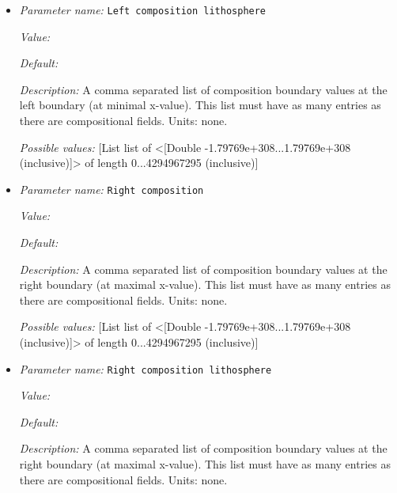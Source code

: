 \begin{itemize}
{\it Possible values:} [List list of <[Double -1.79769e+308...1.79769e+308 (inclusive)]> of length 0...4294967295 (inclusive)]
\item {\it Parameter name:} {\tt Left composition lithosphere}
\label{parameters:Boundary composition model/Box with lithosphere boundary indicators/Left composition lithosphere}


{\it Value:} 


{\it Default:} 


{\it Description:} A comma separated list of composition boundary values at the left boundary (at minimal x-value). This list must have as many entries as there are compositional fields. Units: none.


{\it Possible values:} [List list of <[Double -1.79769e+308...1.79769e+308 (inclusive)]> of length 0...4294967295 (inclusive)]
\item {\it Parameter name:} {\tt Right composition}
\label{parameters:Boundary composition model/Box with lithosphere boundary indicators/Right composition}


{\it Value:} 


{\it Default:} 


{\it Description:} A comma separated list of composition boundary values at the right boundary (at maximal x-value). This list must have as many entries as there are compositional fields. Units: none.


{\it Possible values:} [List list of <[Double -1.79769e+308...1.79769e+308 (inclusive)]> of length 0...4294967295 (inclusive)]
\item {\it Parameter name:} {\tt Right composition lithosphere}
\label{parameters:Boundary composition model/Box with lithosphere boundary indicators/Right composition lithosphere}


{\it Value:} 


{\it Default:} 


{\it Description:} A comma separated list of composition boundary values at the right boundary (at maximal x-value). This list must have as many entries as there are compositional fields. Units: none.



\end{itemize}
